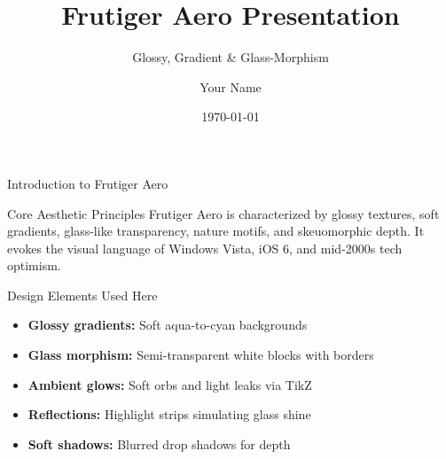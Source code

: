 \documentclass[aspectratio=169]{beamer}
\title{Frutiger Aero Presentation}
\subtitle{Glossy, Gradient \& Glass-Morphism}
\author{Your Name}
\institute{Your Institution}
\date{\today}
\begin{document}
\begin{frame}[plain]
    \titlepage
\end{frame}

\begin{frame}{Introduction to Frutiger Aero}
    
    \begin{block}{Core Aesthetic Principles}
        Frutiger Aero is characterized by glossy textures, soft gradients, 
        glass-like transparency, nature motifs, and skeuomorphic depth. 
        It evokes the visual language of Windows Vista, iOS 6, and mid-2000s 
        tech optimism.
    \end{block}
    
    \begin{alertblock}{Design Elements Used Here}
        \begin{itemize}
            \item \textbf{Glossy gradients:} Soft aqua-to-cyan backgrounds
            \item \textbf{Glass morphism:} Semi-transparent white blocks with borders
            \item \textbf{Ambient glows:} Soft orbs and light leaks via TikZ
            \item \textbf{Reflections:} Highlight strips simulating glass shine
            \item \textbf{Soft shadows:} Blurred drop shadows for depth
        \end{itemize}
    \end{alertblock}
    
\end{frame}
\end{document}
